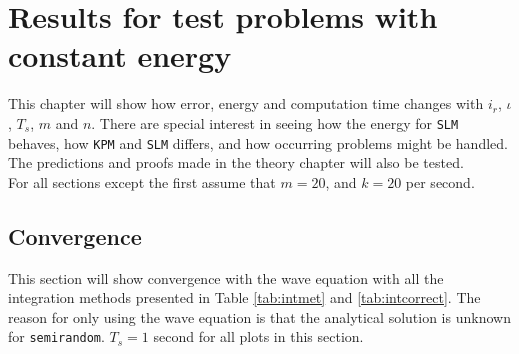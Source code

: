 \chapter{Results for test problems with constant energy}%
\label{sec:constres}
This chapter will show how error, energy and computation time changes with $i_r$, $\iota$, $T_s$, $m$ and $n$. There are special interest in seeing how the energy for \texttt{SLM} behaves, how \texttt{KPM} and \texttt{SLM} differs, and how occurring problems might be handled. The predictions and proofs made in the theory chapter will also be tested. \\

\noindent For all sections except the first assume that $m=20$, and $k = 20$ per second. 
\section{Convergence}%
This section will show convergence with the wave equation with all the integration methods presented in Table \ref{tab:intmet} and \ref{tab:intcorrect}. The reason for only using the wave equation is that the analytical solution is unknown for \texttt{semirandom}. $T_s = 1$ second for all plots in this section.
